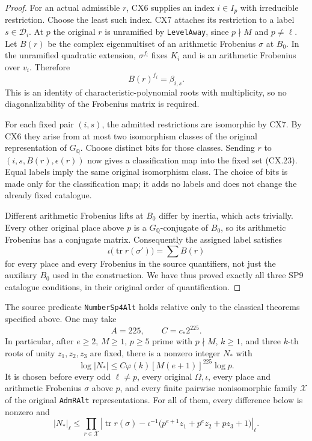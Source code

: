 \begin{proof}
For an actual admissible $r$, CX6 supplies an index
$i\in I_p$ with irreducible restriction.  Choose the
least such index.  CX7 attaches its restriction to a
label $s\in\mathcal D_i$.  At $p$ the original $r$ is
unramified by \texttt{LevelAway}, since $p\nmid M$ and
$p\ne\ell$.  Let $B(r)$ be the complex eigenmultiset
of an arithmetic Frobenius $\sigma$ at $B_0$.  In the
unramified quadratic extension, $\sigma^{f_i}$ fixes
$K_i$ and is an arithmetic Frobenius over $v_i$.
Therefore
\[
                     B(r)^{f_i}=\beta_{i,s}.                  \tag{CX.27}
\]
This is an identity of characteristic-polynomial roots
with multiplicity, so no diagonalizability of the
Frobenius matrix is required.

For each fixed pair $(i,s)$, the admitted restrictions
are isomorphic by CX7.  By CX6 they arise from at most
two isomorphism classes of the original representation
of $G_{\mathbb Q}$.  Choose distinct bits for those
classes.  Sending $r$ to
$(i,s,B(r),\epsilon(r))$ now gives a classification map
into the fixed set (CX.23).  Equal labels imply the same
original isomorphism class.  The choice of bits is made
only for the classification map; it adds no labels and
does not change the already fixed catalogue.

Different arithmetic Frobenius lifts at $B_0$ differ by
inertia, which acts trivially.  Every other original
place above $p$ is a $G_{\mathbb Q}$-conjugate of $B_0$,
so its arithmetic Frobenius has a conjugate matrix.
Consequently the assigned label satisfies
\[
       \iota\bigl(\operatorname{tr}r(\sigma')\bigr)
                   =\sum B(r)                               \tag{CX.28}
\]
for every place and every Frobenius in the source
quantifiers, not just the auxiliary $B_0$ used in the
construction.  We have thus proved exactly all three
SP9 catalogue conditions, in their original order of
quantification.
\end{proof}

\begin{proposition}
\label{claim:CX9}
The source predicate \texttt{NumberSp4Alt} holds
relative only to the classical theorems specified above.
One may take
\[
                  A=225,\qquad C=c_*2^{225}.                  \tag{CX.29}
\]
In particular, after $e\ge2$, $M\ge1$, $p\ge5$ prime
with $p\nmid M$, $k\ge1$, and three $k$-th roots of
unity $z_1,z_2,z_3$ are fixed, there is a nonzero
integer $N_*$ with
\[
 \log|N_*|\le C\varphi(k)[M(e+1)]^{225}\log p.                 \tag{CX.30}
\]
It is chosen before every odd $\ell\ne p$, every original
$\Omega,\iota$, every place and arithmetic Frobenius
$\sigma$ above $p$, and every finite pairwise
nonisomorphic family $\mathcal X$ of the original
\texttt{AdmRAlt} representations.  For all of them,
every difference below is nonzero and
\[
 |N_*|_\ell\le
 \prod_{r\in\mathcal X}
 \left|\operatorname{tr}r(\sigma)-
 \iota^{-1}\bigl(p^{e+1}z_1+p^e z_2+pz_3+1\bigr)\right|_\ell.
                                                               \tag{CX.31}
\]
\end{proposition}

